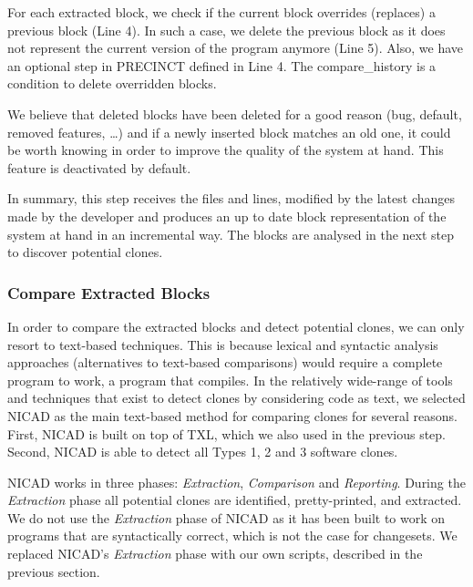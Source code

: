 For each extracted block, we check if the current block overrides (replaces) a previous block (Line 4).
In such a case, we delete the previous block as it does not represent the current version of the program anymore (Line 5).
Also, we have an optional step in PRECINCT defined in Line 4. The compare\_history is a condition to delete overridden blocks.

We believe that deleted blocks have been deleted for a good reason (bug, default, removed features, \ldots) and if a newly inserted block matches an old one, it could be worth knowing in order to improve the quality of the system at hand.
This feature is deactivated by default.

In summary, this step receives the files and lines, modified by the latest changes made by the developer and produces an up to date block representation of the system at hand in an incremental way.
The blocks are analysed in the next step to discover potential clones.

\subsubsection{Compare Extracted Blocks}
\label{sub:Compare Extracted Blocks}

In order to compare the extracted blocks and detect potential clones, we can only resort to text-based techniques.
This is because lexical and syntactic analysis approaches (alternatives to text-based comparisons) would require a complete program to work, a program that compiles.
In the relatively wide-range of tools and techniques that exist to detect clones by considering code as text\cite{Johnson1993,Johnson1994,Marcus,Manber1994,StephaneDucasse,Wettel2005}, we selected NICAD as the main text-based method for comparing clones \cite{Cordy2011} for several reasons.
First, NICAD is built on top of TXL, which we also used in the previous step.
Second, NICAD is able to detect all Types 1, 2 and 3 software clones.

NICAD  works in three phases: \textit{Extraction}, \textit{Comparison} and \textit{Reporting}. During the \textit{Extraction} phase all potential clones are identified, pretty-printed, and extracted.
We do not use the \textit{Extraction} phase of NICAD as it has been built to work on programs that are syntactically correct, which is not the case for changesets.
We replaced NICAD's \textit{Extraction} phase with our own scripts, described in the previous section.


